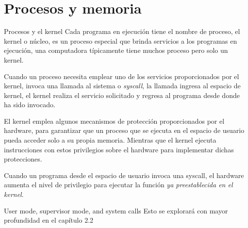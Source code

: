\documentclass{libs/ufc_format}
\begin{document}
\section{Procesos y memoria}
\begin{frame}{Procesos y el kernel}
  Cada programa en ejecución tiene el nombre de proceso, el kernel o núcleo, es un proceso especial que brinda servicios a los programas en ejecución, una computadora típicamente tiene muchos proceso pero solo un kernel.

  \vspace{0.4cm}

  Cuando un proceso necesita emplear uno de los servicios proporcionados por el kernel, invoca una llamada al sistema o \textit{syscall}, la llamada ingresa al espacio de kernel, el kernel realiza el servicio solicitado y regresa al programa desde donde ha sido invocado. \newline

  \vspace{0.2cm}

\end{frame}
\begin{frame}{}
  El kernel emplea algunos mecanismos de protección proporcionados por el hardware, para garantizar que un proceso que se ejecuta en el espacio de usuario pueda acceder solo a su propia memoria. Mientras que el kernel ejecuta instrucciones con estos privilegios sobre el hardware para implementar dichas protecciones.

  \vspace{0.3cm}

  Cuando un programa desde el espacio de usuario invoca una syscall, el hardware aumenta el nivel de privilegio para ejecutar la función \emph{ya preestablecida en el kernel}.

  \vspace{0.2cm}

  \begin{block}{User mode, supervisor mode, and system calls}
    Esto se explorará con mayor profundidad en el capítulo 2.2
  \end{block}
\end{frame}
\end{document}
